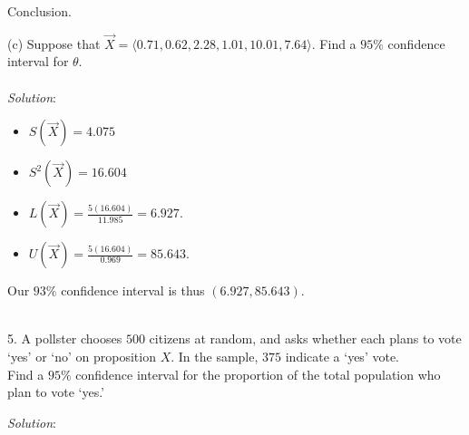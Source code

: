 \documentclass[12pt]{article}
\newcommand{\XB}{\color{black}}
\newcommand{\XBB}{\color{blue}}
\newcommand{\ds}{\displaystyle}
\begin{document}
\noindent
Conclusion. \\

\vspace{2.5mm}

(c) Suppose that $ \overrightarrow{X} = \langle 0.71, 0.62, 2.28, 1.01, 10.01, 7.64 \rangle $.
Find a $ 95\% $ confidence interval for $ \theta $. \\
\vspace{2.5mm} \\
\textit{Solution}:
\vspace{2.5mm} \\ 

\begin{itemize}
    \item $ \ds S(\overrightarrow{X}) = 4.075 $
    \item $ \ds S^{2}(\overrightarrow{X}) = 16.604 $
    \item $ \ds L(\overrightarrow{X}) = \frac{5(16.604)}{11.985} = 6.927 $. \\
    \item $ \ds U(\overrightarrow{X}) = \frac{5(16.604)}{0.969} = 85.643 $. \\
\end{itemize}

\noindent
Our $ 93\% $ confidence interval is thus $ (6.927, 85.643) $. \\

\vspace{2.5mm}

\newpage
\XBB\hrulefill\XB \\

5. A pollster chooses $ 500 $ citizens at random, and asks whether each plans to vote `yes' or `no' on proposition $ X $.
In the sample, $ 375 $ indicate a `yes' vote. \\

Find a $ 95\% $ confidence interval for the proportion of the total population who plan to vote `yes.'

\XBB\hrulefill\XB 
\vspace{5mm} 

\vspace{2.5mm}
\textit{Solution}:
\vspace{2.5mm} \\
\end{document}
